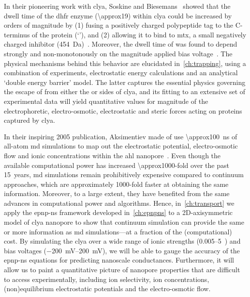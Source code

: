 \clearpage

%
%

In their pioneering work with \gls{clya}, Soskine and Biesemans~\etal{} showed that the dwell time of the
\gls{dhfr} enzyme (\SI{\approx19}{\kDa}) within \gls{clya} could be increased by orders of magnitude by (1)
fusing a positively charged polypeptide tag to the C-terminus of the protein (`\DHFRt'), and (2) allowing it
to bind to \gls{mtx}, a small negatively charged inhibitor (\SI{454}{\dalton})~\cite{Soskine-Biesemans-2015}.
Moreover, the dwell time of \DHFRt was found to depend strongly and non-monotonously on the magnitude applied
bias voltage~\cite{Biesemans-2015}. The physical mechanisms behind this behavior are elucidated
in~\cref{ch:trapping}, using a combination of experiments, electrostatic energy calculations and an analytical
`double energy barrier' model. The latter captures the essential physics governing the escape of \DHFRt{} from
either the \cisi{} or \transi{} sides of \gls{clya}, and its fitting to an extensive set of experimental data
will yield quantitative values for magnitude of the electrophoretic, electro-osmotic, electrostatic and steric
forces acting on proteins captured by \gls{clya}.


%
%

In their inspiring 2005 publication, Aksimentiev \etal{} made of use \SI{\approx100}{\ns} of all-atom \gls{md}
simulations to map out the electrostatic potential, electro-osmotic flow and ionic concentrations within the
\gls{ahl} nanopore~\cite{Aksimentiev-2005}. Even though the available computational power has increased
\num{\approx1000}-fold over the past 15~years, \gls{md} simulations remain prohibitively expensive compared to
continuum approaches, which are approximately 1000-fold faster at obtaining the same information. Moreover, to
a large extent, they have benefited from the same advances in computational power and algorithms. Hence,
in~\cref{ch:transport} we apply the \gls{epnp-ns} framework developed in~\cref{ch:epnpns} to a 2D-axisymmetric
model of \gls{clya} nanopore to show that continuum simulation can provide the same or more information as
\gls{md} simulations---at a fraction of the (computational) cost. By simulating the \gls{clya} over a wide
range of ionic strengths (\SIrange{0.005}{5}{\Molar}~) and bias voltages
(\SIrange[retain-explicit-plus=true]{-200}{+200}{\mV}), we will be able to gauge the accuracy of the
\gls{epnp-ns} equations for predicting nanoscale conductances. Furthermore, it will allow us to paint a
quantitative picture of nanopore properties that are difficult to access experimentally, including ion
selectivity, ion concentrations, (non)equilibrium electrostatic potentials and the electro-osmotic flow.


\cleardoublepage

